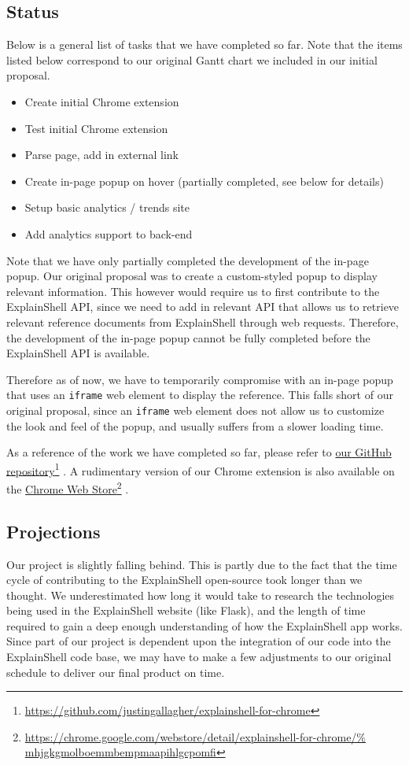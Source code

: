 \documentclass[11pt]{article}
\newcommand\fnurl[2]{%
\href{#1}{#2}\footnote{\url{#1}}%
}
\begin{document}
\subsection{Status}

Below is a general list of tasks that we have completed so far.
Note that the items listed below correspond to our original Gantt chart we
included in our initial proposal.
\begin{itemize}
  \item Create initial Chrome extension
  \item Test initial Chrome extension
  \item Parse page, add in external link
  \item Create in-page popup on hover (partially completed, see below
  for details)
  \item Setup basic analytics / trends site
  \item Add analytics support to back-end
\end{itemize}
Note that we have only partially completed the development of the in-page
popup. Our original proposal was to create a custom-styled popup to display
relevant information. This however would require us to first contribute to the
ExplainShell API, since we need to add in relevant API that allows us to
retrieve relevant reference documents from ExplainShell through web requests.
Therefore, the development of the in-page popup cannot be fully completed
before the ExplainShell API is available.

Therefore as of now, we have to temporarily compromise with an in-page popup
that uses an \texttt{iframe} web element to display the reference. This falls
short of our original proposal, since an \texttt{iframe} web element does not
allow us to customize the look and feel of the popup, and usually suffers from a
slower loading time.

As a reference of the work we have completed so far, please refer to
\fnurl{https://github.com/justingallagher/explainshell-for-chrome}{our GitHub
repository}. A rudimentary version of our Chrome extension is also available on
the
\fnurl{https://chrome.google.com/webstore/detail/explainshell-for-chrome/%
mhjgkgmolboemmbempmaapihlgcpomfi}{Chrome Web Store}.

\subsection{Projections}

Our project is slightly falling behind. This is partly due to the fact that
the time cycle of contributing to the ExplainShell open-source took longer
than we thought. We underestimated how long it would take to research the
technologies being used in the ExplainShell website (like Flask), and the length
of time required to gain a deep enough understanding of how the ExplainShell app
works. Since part of our project is dependent upon the integration of our code
into the ExplainShell code base, we may have to make a few adjustments to our
original schedule to deliver our final product on time.
\end{document}
